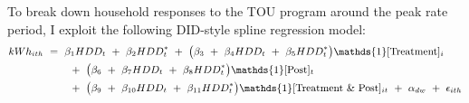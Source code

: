 To break down household responses to the TOU program around the peak rate period, I exploit the following DID-style spline regression model: %
\begin{equation}
\small
\begin{split}
    kWh_{ith} \
    & = \ \beta_{1} HDD_{t} \ + \ \beta_{2} HDD_{t}^{*} \ + \ \big( \beta_{3} \ + \ \beta_{4} HDD_{t} \ + \ \beta_{5} HDD_{t}^{*} \big) \mathds{1}[\text{Treatment}]_{i} \\
    & \hspace{0.7cm} + \ \big( \beta_{6} \ + \ \beta_{7} HDD_{t} \ + \ \beta_{8} HDD_{t}^{*} \big) \mathds{1}[\text{Post}]_{t} \\
    & \hspace{0.7cm} + \ \big( \beta_{9} \ + \ \beta_{10} HDD_{t} \ + \ \beta_{11} HDD_{t}^{*} \big) \mathds{1}[\text{Treatment \& Post}]_{it} \ + \ \alpha_{dw} \ + \ \epsilon_{ith} 
\end{split}
\label{Eq:Model-Specification_Breakdown-of-Hourly-Average-Treatment-Effect}
\end{equation}
